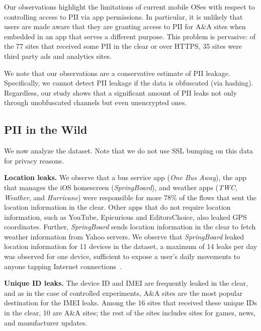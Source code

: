 Our observations highlight the limitations of current mobile OSes with respect to controlling access to PII via app permissions. 
In particular, it is unlikely that users are made aware that they are granting access to PII for A\&A sites when embedded in an app that serves a different purpose. 
This problem is pervasive: of the 77 sites that received some PII in the clear or over HTTPS, 35 sites were third party ads and analytics sites.

We note that our observations are a conservative estimate of PII leakage. 
Specifically, we cannot detect PII leakage if the data is obfuscated (\eg via hashing). 
Regardless,  our study shows that a significant amount of PII leaks not only through unobfuscated channels but even unencrypted ones. 

\subsection{PII in the Wild}

We now analyze the \mobWild{} dataset. 
Note that we do not use SSL bumping on this data for privacy reasons. 

\noindent\textbf{Location leaks.} We observe that a bus service app (\emph{One Bus Away}), the
app that manages the iOS homescreen (\emph{SpringBoard}), and
weather apps (\emph{TWC}, \emph{Weather}, and \emph{Hurricane})
were responsible for more 78\% of the flows that sent the location
information in the clear. Other apps that do not require location information, 
such as YouTube, Epicurious and EditorsChoice, also leaked GPS coordinates.
Further, \emph{SpringBoard} sends location information in the clear to fetch weather information from Yahoo servers. 
We observe that \emph{SpringBoard} leaked location information for 11 devices in the \mobWild dataset, a maximum of 14 leaks per day was observed for one device, sufficient to expose a user's daily movements to anyone tapping Internet connections~\cite{nsa:globaltracking}. 

\noindent\textbf{Unique ID leaks.} 
The device ID and IMEI are frequently leaked in the clear, and as in the case of controlled experiments, A\&A sites are the most popular destination for the IMEI leaks.  
Among the 16 sites that received  these unique IDs in the clear, 10 are A\&A sites; the rest of the sites includes sites for games, news, and manufacturer updates.

